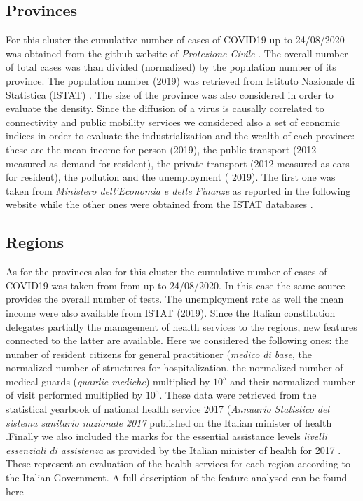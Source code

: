 \documentclass[
12pt, %
a4paper, %
oneside, %
headinclude,footinclude, %
BCOR5mm, %
]{scrartcl}
\begin{document}
\subsection{Provinces} 
For this cluster the cumulative number of cases of COVID19 up to 24/08/2020 was obtained from the github website of \textit{Protezione Civile} \cite{github-protezionecivile}. The overall number of total cases was than divided (normalized) by the population number of its province. The population number (2019) was retrieved from Istituto Nazionale di Statistica (ISTAT) \cite{ISTAT}. The size of the province was also considered in order to evaluate the density. Since the diffusion of a virus is causally correlated to connectivity and public mobility services \cite{lloyd2001viruses,kraemer2020effect} we considered also a set of economic indices in order to evaluate the industrialization and the wealth of each province: these are the mean income for person (2019), the public transport (2012 measured as demand for resident), the private transport (2012 measured as cars for resident), the pollution and the unemployment ( 2019). The first one was taken from \textit{Ministero dell'Economia e delle Finanze} as reported in the following website \cite{MEF} while the other ones were obtained from the ISTAT databases \cite{ISTAT}.

\subsection{Regions}
As for the provinces also for this cluster the cumulative number of cases of COVID19 was taken from from \cite{github-protezionecivile} up to 24/08/2020. In this case the same source provides the overall number of tests. The unemployment rate as well the mean income were also available from ISTAT \cite{ISTAT} (2019). Since the Italian constitution delegates partially the management of health services to the regions, new features connected to the latter are available. Here we considered the following ones: the number of resident citizens for general practitioner (\textit{medico di base}, the normalized number of structures for hospitalization, the normalized number of medical guards (\textit{guardie mediche}) multiplied by $10^{5}$ and their normalized number of visit performed multiplied by $10^{5}$. These data were retrieved from the statistical yearbook of national health service 2017 (\textit{Annuario Statistico del sistema sanitario nazionale 2017} published on the Italian minister of health \cite{AnnuarioSSN2017}.Finally we also included the marks for the essential assistance levels \textit{livelli essenziali di assistenza} as provided by the Italian minister of health for 2017 \cite{LeaRank} . These represent an evaluation of the health services for each region according to the Italian Government. A full description of the feature analysed can be found here \cite{LeaDesc}
\end{document}
